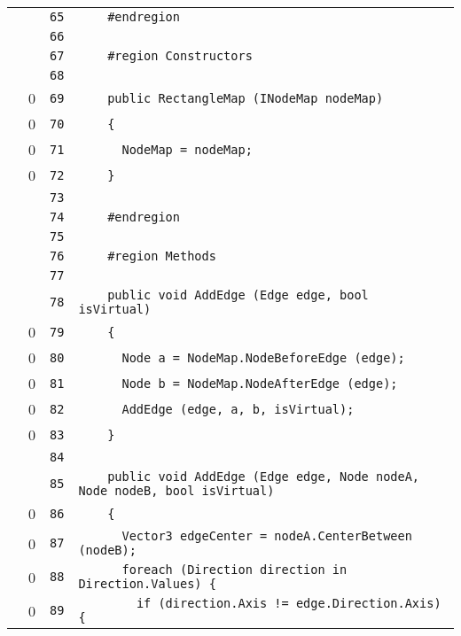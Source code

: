 \documentclass[a4paper,10pt]{article}
\begin{document}
\begin{longtable}[l]{lrrl}
\cellcolor{gray} &  & \verb~65~ & \verb~    #endregion~\\
\cellcolor{gray} &  & \verb~66~ & \verb~~\\
\cellcolor{gray} &  & \verb~67~ & \verb~    #region Constructors~\\
\cellcolor{gray} &  & \verb~68~ & \verb~~\\
\cellcolor{red} & 0 & \verb~69~ & \verb~    public RectangleMap (INodeMap nodeMap)~\\
\cellcolor{red} & 0 & \verb~70~ & \verb~    {~\\
\cellcolor{red} & 0 & \verb~71~ & \verb~      NodeMap = nodeMap;~\\
\cellcolor{red} & 0 & \verb~72~ & \verb~    }~\\
\cellcolor{gray} &  & \verb~73~ & \verb~~\\
\cellcolor{gray} &  & \verb~74~ & \verb~    #endregion~\\
\cellcolor{gray} &  & \verb~75~ & \verb~~\\
\cellcolor{gray} &  & \verb~76~ & \verb~    #region Methods~\\
\cellcolor{gray} &  & \verb~77~ & \verb~~\\
\cellcolor{gray} &  & \verb~78~ & \verb~    public void AddEdge (Edge edge, bool isVirtual)~\\
\cellcolor{red} & 0 & \verb~79~ & \verb~    {~\\
\cellcolor{red} & 0 & \verb~80~ & \verb~      Node a = NodeMap.NodeBeforeEdge (edge);~\\
\cellcolor{red} & 0 & \verb~81~ & \verb~      Node b = NodeMap.NodeAfterEdge (edge);~\\
\cellcolor{red} & 0 & \verb~82~ & \verb~      AddEdge (edge, a, b, isVirtual);~\\
\cellcolor{red} & 0 & \verb~83~ & \verb~    }~\\
\cellcolor{gray} &  & \verb~84~ & \verb~~\\
\cellcolor{gray} &  & \verb~85~ & \verb~    public void AddEdge (Edge edge, Node nodeA, Node nodeB, bool isVirtual)~\\
\cellcolor{red} & 0 & \verb~86~ & \verb~    {~\\
\cellcolor{red} & 0 & \verb~87~ & \verb~      Vector3 edgeCenter = nodeA.CenterBetween (nodeB);~\\
\cellcolor{red} & 0 & \verb~88~ & \verb~      foreach (Direction direction in Direction.Values) {~\\
\cellcolor{red} & 0 & \verb~89~ & \verb~        if (direction.Axis != edge.Direction.Axis) {~\\

\end{longtable}
\end{document}
